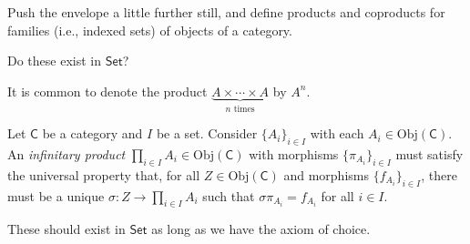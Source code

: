 \documentclass[12pt,letterpaper,boxed]{hmcpset}
\newcommand{\Obj}{\mathrm{Obj}}
\newcommand{\Set}{\mathsf{Set}}
\begin{document}
\begin{problem}[5.10]
	Push the envelope a little further still, and define products and coproducts for families (i.e., indexed sets) of objects of a category.
	
	Do these exist in $\Set$?
	
	It is common to denote the product $\underbrace{A\times\cdots\times A}_{n \text{ times}}$ by $A^n$.
\end{problem}
\begin{solution}
	Let $\mathsf{C}$ be a category and $I$ be a set. Consider $\{A_i\}_{i\in I}$ with each
	$A_i\in\Obj(\mathsf{C})$. An \textit{infinitary product} $\prod_{i\in I}
	A_i\in\Obj(\mathsf{C})$ with morphisms $\{\pi_{A_i}\}_{i\in I}$ must satisfy the
	universal property that, for all $Z\in\Obj(\mathsf{C})$ and morphisms $\{f_{A_i}\}_{i\in
		I}$, there must be a unique $\sigma:Z\to\prod_{i\in I}A_i$ such that
	$\sigma\pi_{A_i}=f_{A_i}$ for all $i\in I$.
	
	These should exist in $\Set$ as long as we have the axiom of choice.
\end{solution}
\end{document}
